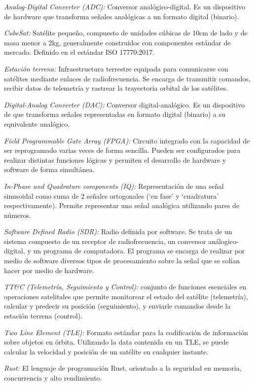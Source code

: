 \textit{Analog-Digital Converter (ADC):} Conversor analógico-digital. Es un dispositivo de hardware que transforma señales analógicas a un formato digital (binario).

\textit{CubeSat:} Satélite pequeño, compuesto de unidades cúbicas de 10cm de lado y de masa menor a 2kg, generalmente construidos con componentes estándar de mercado. Definido en el estándar ISO 17770:2017.

\textit{Estación terrena:} Infraestructura terrestre equipada para comunicarse con satélites mediante enlaces de radiofrecuencia. Se encarga de transmitir comandos, recibir datos de telemetría y rastrear la trayectoria orbital de los satélites.

\textit{Digital-Analog Converter (DAC):} Conversor digital-analógico. Es un dispositivo de que transforma señales representadas en formato digital (binario) a su equivalente analógico.

\textit{Field Programmable Gate Array (FPGA):} Circuito integrado con la capacidad de ser reprogramado varias veces de forma sencilla. Pueden ser configurados para realizar distintas funciones lógicas y permiten el desarrollo de hardware y software de forma simultánea.

\textit{In-Phase and Quadrature components (IQ):} Representación de una señal sinusoidal como suma de 2 señales ortogonales (`en fase' y `cuadratura' respectivamente). Permite representar una señal analógica utilizando pares de números.

\textit{Software Defined Radio (SDR):} Radio definida por software. Se trata de un sistema compuesto de un receptor de radiofrecuencia, un conversor análogico-digital, y un programa de computadora. El programa se encarga de realizar por medio de software diversos tipos de procesamiento sobre la señal que se solían hacer por medio de hardware.

\textit{TT\&C (Telemetría, Seguimiento y Control):} conjunto de funciones esenciales en operaciones satelitales que permite monitorear el estado del satélite (telemetría), calcular y predecir su posición (seguimiento), y enviarle comandos desde la estación terrena (control).

\textit{Two Line Element (TLE):} Formato estándar para la codificación de información sobre objetos en órbita. Utilizando la data contenida en un TLE, se puede calcular la velocidad y posición de un satélite en cualquier instante.

\textit{Rust:} El lenguaje de programación Rust, orientado a la seguridad en memoria, concurrencia y alto rendimiento. 

